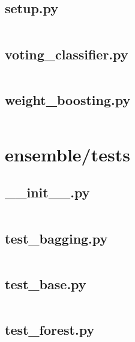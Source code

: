 \documentclass{article}
\begin{document}
\subsection{setup.py}
\inputminted{python}{/home/dufferzafar/dev/@clones/scikit-learn/sklearn/ensemble/setup.py}
\newpage

\subsection{voting\_classifier.py}
\inputminted{python}{/home/dufferzafar/dev/@clones/scikit-learn/sklearn/ensemble/voting_classifier.py}
\newpage

\subsection{weight\_boosting.py}
\inputminted{python}{/home/dufferzafar/dev/@clones/scikit-learn/sklearn/ensemble/weight_boosting.py}
\newpage

\section{ensemble/tests}

\subsection{\_\_init\_\_.py}
\inputminted{python}{/home/dufferzafar/dev/@clones/scikit-learn/sklearn/ensemble/tests/__init__.py}
\newpage

\subsection{test\_bagging.py}
\inputminted{python}{/home/dufferzafar/dev/@clones/scikit-learn/sklearn/ensemble/tests/test_bagging.py}
\newpage

\subsection{test\_base.py}
\inputminted{python}{/home/dufferzafar/dev/@clones/scikit-learn/sklearn/ensemble/tests/test_base.py}
\newpage

\subsection{test\_forest.py}
\inputminted{python}{/home/dufferzafar/dev/@clones/scikit-learn/sklearn/ensemble/tests/test_forest.py}
\newpage
\end{document}
